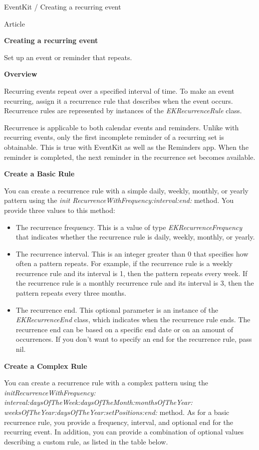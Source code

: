 \documentclass{article}
\title{}
\author{}
\date{}
\begin{document}
EventKit / Creating a recurring event

Article

\textbf{Creating a recurring event}

Set up an event or reminder that repeats.

\textbf{Overview}

Recurring events repeat over a specified interval of time. To make an event recurring, assign it a recurrence rule that describes when the event occurs. Recurrence rules are represented by instances of the \textit{EKRecurrenceRule} class.

Recurrence is applicable to both calendar events and reminders. Unlike with recurring events, only the first incomplete reminder of a recurring set is obtainable. This is true with EventKit as well as the Reminders app. When the reminder is completed, the next reminder in the recurrence set becomes available.

\textbf{Create a Basic Rule}

You can create a recurrence rule with a simple daily, weekly, monthly, or yearly pattern using the \textit{init RecurrenceWithFrequency:interval:end:} method. You provide three values to this method:

\begin{itemize}
    \item The recurrence frequency. This is a value of type \textit{EKRecurrenceFrequency} that indicates whether the recurrence rule is daily, weekly, monthly, or yearly.
    \item The recurrence interval. This is an integer greater than 0 that specifies how often a pattern repeats. For example, if the recurrence rule is a weekly recurrence rule and its interval is 1, then the pattern repeats every week. If the recurrence rule is a monthly recurrence rule and its interval is 3, then the pattern repeats every three months.
    \item The recurrence end. This optional parameter is an instance of the \textit{EKRecurrenceEnd} class, which indicates when the recurrence rule ends. The recurrence end can be based on a specific end date or on an amount of occurrences. If you don't want to specify an end for the recurrence rule, pass nil.
\end{itemize}

\textbf{Create a Complex Rule}

You can create a recurrence rule with a complex pattern using the \textit{initRecurrenceWithFrequency: interval:daysOfTheWeek:daysOfTheMonth:monthsOfTheYear: weeksOfTheYear:daysOfTheYear:setPositions:end:} method. As for a basic recurrence rule, you provide a frequency, interval, and optional end for the recurring event. In addition, you can provide a combination of optional values describing a custom rule, as listed in the table below.
\end{document}
